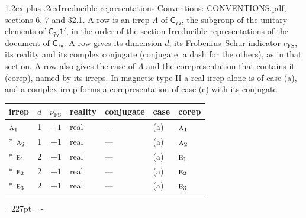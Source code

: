 \documentclass[10pt,a4paper]{article}
\makeatletter
\renewcommand\section{\@startsection{section}{1}{\z@}{-3ex plus -1ex minus -.2ex}%
  {1.2ex plus .2ex}{\normalfont\large\sffamily\bfseries\color{parttitle}}}
\newcommand{\needspace}[1]{\par\penalty-100\begingroup\dimen0=#1\relax\dimen2=\pagegoal
  \advance\dimen2-\pagetotal\ifdim\dimen0>\dimen2\relax\ifdim\dimen2>0pt\vfil\break\fi\fi
  \endgroup}
\numberwithin{equation}{section}
\newcommand{\grp}[1]{\mathsf{#1}}
\newcommand{\irr}[1]{\text{\normalfont\scshape #1}}
\newcommand{\fsind}{\nu_{\mathrm{FS}}}
\makeatother
\begin{document}
\section{Irreducible representations}\label{s:irreps}
Conventions: \href{../../CONVENTIONS.pdf}{CONVENTIONS.pdf}, sections \href{../../../rotation/CONVENTIONS.pdf\#conv.6}{6}, \href{../../../rotation/CONVENTIONS.pdf\#conv.7}{7} and \href{../../CONVENTIONS.pdf\#conv.32.1}{32.1}.
\leavevmode\label{n:irrep.Delta}A row is an irrep $\Lambda$ of $\grp{C_{7v}}$, the subgroup of the unitary elements of $\grp{C_{7v}1'}$, in the order of the section Irreducible representations of the document of \href{../../../rotation/data/pdf/C7v.pdf}{$\grp{C_{7v}}$}. \label{n:index.dimension}\label{n:index.frobenius}\label{n:head.irrep}\label{n:head.reality}\label{n:head.conjugate}A row gives its dimension $d$, its Frobenius--Schur indicator $\fsind$, its reality and its complex conjugate (conjugate, a dash for the others), as in that section. \label{n:head.case.corep}\label{n:head.corep}A row also gives the case of $\Lambda$ and the corepresentation that contains it (corep), named by its irreps. In magnetic type II a real irrep alone is of case (a), and a complex irrep forms a corepresentation of case (c) with its conjugate.
\setlength{\emergencystretch}{2em}\par\setlength{\emergencystretch}{0pt}
{\small\renewcommand{\arraystretch}{1.25}\setlength{\tabcolsep}{4pt}\begin{longtable}{@{}lrrllll@{}}\toprule
irrep & $d$ & $\fsind$ & reality & conjugate & case & corep\\\midrule\endhead
\bottomrule\endfoot\endlastfoot
$\irr{a}_{1}$ & 1 & $+1$ & real & --- & (a) & $\irr{a}_{1}$\\*
$\irr{a}_{2}$ & 1 & $+1$ & real & --- & (a) & $\irr{a}_{2}$\\*
$\irr{e}_{1}$ & 2 & $+1$ & real & --- & (a) & $\irr{e}_{1}$\\*
$\irr{e}_{2}$ & 2 & $+1$ & real & --- & (a) & $\irr{e}_{2}$\\*
$\irr{e}_{3}$ & 2 & $+1$ & real & --- & (a) & $\irr{e}_{3}$\\
\bottomrule\end{longtable}}
\needspace{227pt}
\end{document}
